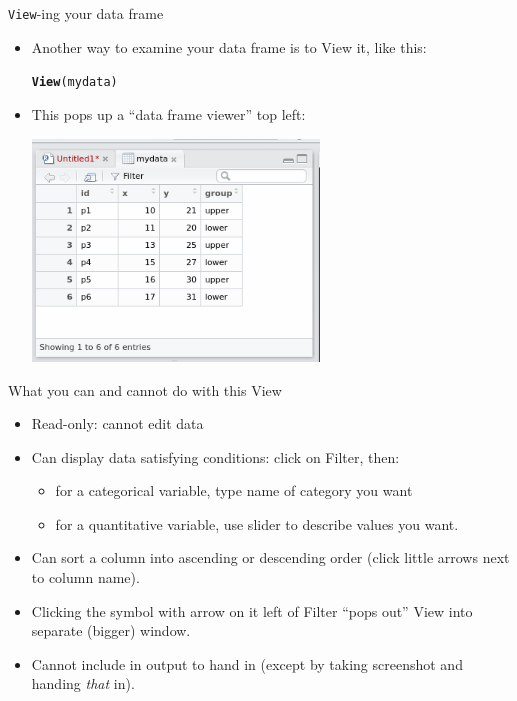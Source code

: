 \documentclass[unknownkeysallowed]{beamer}\usepackage[]{graphicx}\usepackage[]{color}
\makeatletter
\newcommand{\hlstd}[1]{\textcolor[rgb]{0.345,0.345,0.345}{#1}}%
\newcommand{\hlkwd}[1]{\textcolor[rgb]{0.737,0.353,0.396}{\textbf{#1}}}%
\newenvironment{kframe}{%
 \def\at@end@of@kframe{}%
 \ifinner\ifhmode%
  \def\at@end@of@kframe{\end{minipage}}%
  \begin{minipage}{\columnwidth}%
 \fi\fi%
 \def\FrameCommand##1{\hskip\@totalleftmargin \hskip-\fboxsep
 \colorbox{shadecolor}{##1}\hskip-\fboxsep
     \hskip-\linewidth \hskip-\@totalleftmargin \hskip\columnwidth}%
 \MakeFramed {\advance\hsize-\width
   \@totalleftmargin\z@ \linewidth\hsize
   \@setminipage}}%
 {\par\unskip\endMakeFramed%
 \at@end@of@kframe}
\newenvironment{knitrout}{}{} %
\makeatother
\begin{document}
\begin{frame}[fragile]{\texttt{View}-ing your data frame}
    
    \begin{itemize}
    \item Another way to examine your data frame is to View it, like this:
      
\begin{knitrout}
\color{fgcolor}\begin{kframe}
\begin{alltt}
\hlkwd{View}\hlstd{(mydata)}
\end{alltt}
\end{kframe}
\end{knitrout}

\item This pops up a ``data frame viewer'' top left:
  
  \includegraphics[width=0.6\textwidth]{viewview}
    \end{itemize}
  
\end{frame}

\begin{frame}[fragile]{What you can and cannot do with this View}
  
  \begin{itemize}
  \item Read-only: cannot edit data
  \item Can display data satisfying conditions: click on Filter, then:
    \begin{itemize}
    \item for a categorical variable, type name of category you want
    \item for a quantitative variable, use slider to describe values
      you want.
    \end{itemize}
  \item Can sort a column into ascending or descending order (click
    little arrows next to column name).
    
  \item Clicking the symbol with arrow on it left of Filter ``pops
    out'' View into separate (bigger) window.
  \item Cannot include in output to hand in (except by taking
    screenshot and handing \emph{that} in).
  \end{itemize}
  
\end{frame}
\end{document}
